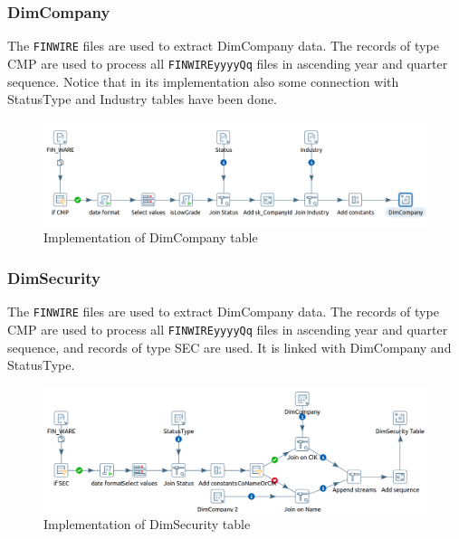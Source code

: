 \documentclass{article}
\newcommand\pcw[1]{\texttt{#1}}
\begin{document}
\subsubsection{DimCompany}
The \pcw{FINWIRE} files are used to extract DimCompany data. The records of type CMP are used to process all \pcw{FINWIREyyyyQq} files in ascending year and quarter sequence. Notice that in its implementation also some connection with StatusType and Industry tables have been done.
\begin{figure}[H] 
\begin{center}
\includegraphics[width=15cm]{images2/dimcompany.png}
\end{center}
\caption{Implementation of DimCompany table}
\label{DimBroker}
\end{figure} 

\subsubsection{DimSecurity}
The \pcw{FINWIRE} files are used to extract DimCompany data. The records of type CMP are used to process all \pcw{FINWIREyyyyQq} files in ascending year and quarter sequence, and records of type SEC are used. It is linked with DimCompany and StatusType.
\begin{figure}[H] 
\begin{center}
\includegraphics[width=15cm]{images2/DimSecIMP.png}
\end{center}
\caption{Implementation of DimSecurity table}
\label{DimBroker}
\end{figure} 
\end{document}
